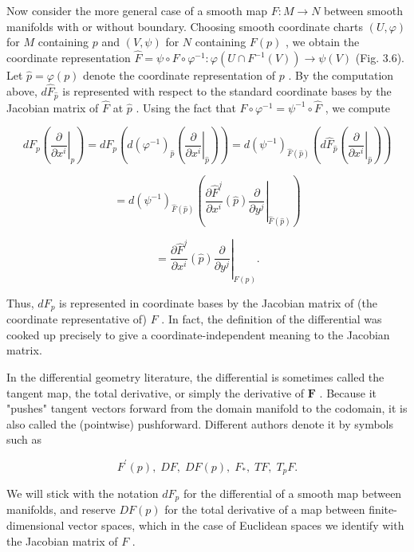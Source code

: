 \begin{remark}
Now consider the more general case of a smooth map $F : M \rightarrow  N$ between smooth manifolds with or without boundary. Choosing smooth coordinate charts $\left( {U,\varphi }\right)$ for $M$ containing $p$ and $\left( {V,\psi }\right)$ for $N$ containing $F\left( p\right)$ , we obtain the coordinate representation $\widehat{F} = \psi  \circ  F \circ  {\varphi }^{-1} : \varphi \left( {U \cap  {F}^{-1}\left( V\right) }\right)  \rightarrow  \psi \left( V\right)$ (Fig. 3.6). Let $\widehat{p} = \varphi \left( p\right)$ denote the coordinate representation of $p$ . By the computation above, $d{\widehat{F}}_{\widehat{p}}$ is represented with respect to the standard coordinate bases by the Jacobian matrix of $\widehat{F}$ at $\widehat{p}$ . Using the fact that $F \circ  {\varphi }^{-1} = {\psi }^{-1} \circ  \widehat{F}$ , we compute

\[
d{F}_{p}\left( {\left. \frac{\partial }{\partial {x}^{i}}\right| }_{p}\right)  = d{F}_{p}\left( {d{\left( {\varphi }^{-1}\right) }_{\widehat{p}}\left( {\left. \frac{\partial }{\partial {x}^{i}}\right| }_{\widehat{p}}\right) }\right)  = d{\left( {\psi }^{-1}\right) }_{\widehat{F}\left( \widehat{p}\right) }\left( {d{\widehat{F}}_{\widehat{p}}\left( {\left. \frac{\partial }{\partial {x}^{i}}\right| }_{\widehat{p}}\right) }\right)
\]

\[
= d{\left( {\psi }^{-1}\right) }_{\widehat{F}\left( \widehat{p}\right) }\left( {\left. \frac{\partial {\widehat{F}}^{j}}{\partial {x}^{i}}\left( \widehat{p}\right) \frac{\partial }{\partial {y}^{j}}\right| }_{\widehat{F}\left( \widehat{p}\right) }\right)
\]

\[
= {\left. \frac{\partial {\widehat{F}}^{j}}{\partial {x}^{i}}\left( \widehat{p}\right) \frac{\partial }{\partial {y}^{j}}\right| }_{F\left( p\right) }. \tag{3.10}
\]

Thus, $d{F}_{p}$ is represented in coordinate bases by the Jacobian matrix of (the coordinate representative of) $F$ . In fact, the definition of the differential was cooked up precisely to give a coordinate-independent meaning to the Jacobian matrix.

In the differential geometry literature, the differential is sometimes called the tangent map, the total derivative, or simply the derivative of $\mathbf{F}$ . Because it "pushes" tangent vectors forward from the domain manifold to the codomain, it is also called the (pointwise) pushforward. Different authors denote it by symbols such as

\[
{F}^{\prime }\left( p\right) ,\;{DF},\;{DF}\left( p\right) ,\;{F}_{ * },\;{TF},\;{T}_{p}F.
\]

We will stick with the notation $d{F}_{p}$ for the differential of a smooth map between manifolds, and reserve ${DF}\left( p\right)$ for the total derivative of a map between finite-dimensional vector spaces, which in the case of Euclidean spaces we identify with the Jacobian matrix of $F$ .
\end{remark}

